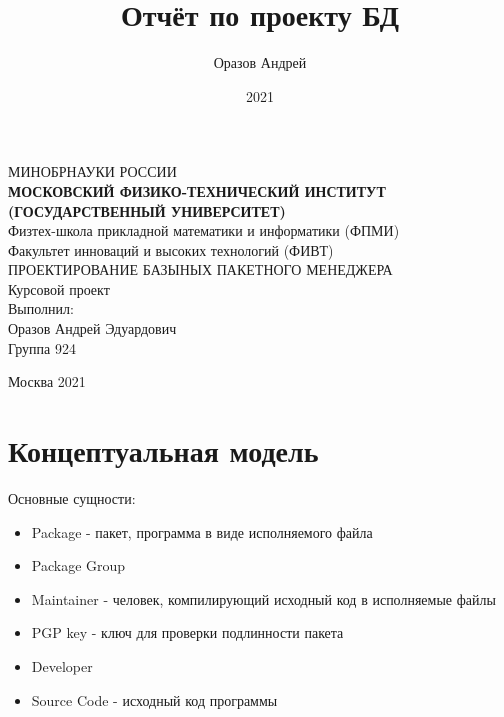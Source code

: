 \documentclass{article}
\author{Оразов Андрей}
\date{2021}
\title{Отчёт по проекту БД}
\begin{document}
\begin{center}
    \hfill \break
    \large{МИНОБРНАУКИ РОССИИ}\\
    \small{\textbf{МОСКОВСКИЙ ФИЗИКО-ТЕХНИЧЕСКИЙ ИНСТИТУТ \\(ГОСУДАРСТВЕННЫЙ УНИВЕРСИТЕТ)}}\\
    \hfill \break
    \normalsize{Физтех-школа прикладной математики и информатики (ФПМИ)}\\
    \normalsize{Факультет инноваций и высоких технологий (ФИВТ)}\\
    \hfill \break
    \hfill \break
    \hfill \break
    \hfill \break
    \large{ПРОЕКТИРОВАНИЕ БАЗЫНЫХ ПАКЕТНОГО МЕНЕДЖЕРА}\\
    \hfill \break
    \hfill \break
    \hfill \break
    \hfill \break
    \hfill \break
    \normalsize{Курсовой проект}\\
    \hfill \break
    \hfill \break
    \normalsize{Выполнил:}\\
    \normalsize{Оразов Андрей Эдуардович}\\
    \normalsize{Группа 924}\\
    \hfill \break
    \hfill \break
\end{center}
\vfill
\begin{center} Москва 2021 \end{center}


\thispagestyle{empty}
\newpage

\section{Концептуальная модель}

Основные сущности:

\begin{itemize}
    \item
        Package - пакет, программа в виде исполняемого файла

    \item
        Package Group

    \item
        Maintainer - человек, компилирующий исходный код в исполняемые файлы

    \item
        PGP key - ключ для проверки подлинности пакета

    \item
        Developer

    \item
        Source Code - исходный код программы


\end{itemize}
\end{document}
